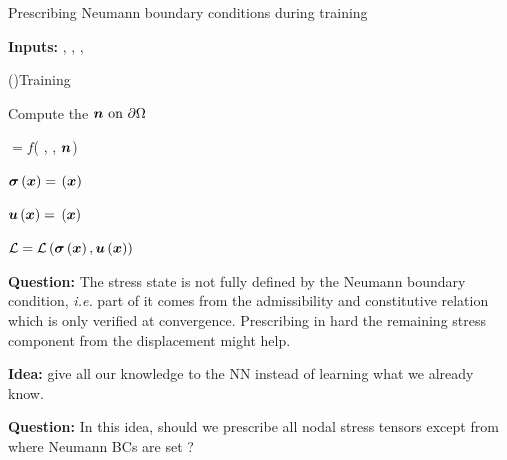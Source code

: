 
{}
\SetEndCharOfAlgoLine{}
\begin{algorithm}[hbtp!]
	\caption{Prescribing Neumann boundary conditions during training}\label{alg:NeumannBCs}
	\textbf{Inputs: } , , ,  \textcolor{GreenLMS}{}
	
	\While(\textcolor{GreenLMS}{}){Training}{
		Compute the $\boldsymbol{n}\text{ on }\partial \Omega$ \textcolor{GreenLMS}{}
		
		  $ = f$( , , $\boldsymbol{n}$)  \textcolor{GreenLMS}{}
		 
		 $\mathcal{\boldsymbol{\sigma}} \left(\boldsymbol{x} \right) = $  $\left(\boldsymbol{x} \right)$ \textcolor{GreenLMS}{}
		 
		 $\boldsymbol{u} \left(\boldsymbol{x} \right) = $  $\left(\boldsymbol{x} \right)$    \textcolor{GreenLMS}{}
		 
		 $\mathcal{L} = \mathcal{L}\left(\mathcal{\boldsymbol{\sigma}} \left(\boldsymbol{x} \right) , \boldsymbol{u} \left(\boldsymbol{x} \right)  \right)$  \textcolor{GreenLMS}{}

		  \textcolor{GreenLMS}{}

	}
\end{algorithm}
\newpage
{}

\textbf{\textcolor{accentcolor}{Question:}} The stress state is not fully defined by the Neumann boundary condition, \emph{i.e.} part of it comes from the admissibility and constitutive relation which is only verified at convergence. Prescribing in hard the remaining stress component from the displacement might help. 

\textbf{\textcolor{accentcolor}{Idea:}} give all our knowledge to the NN instead of learning what we already know. 

\textbf{\textcolor{accentcolor}{Question:}} In this idea, should we prescribe all nodal stress tensors except from where Neumann BCs are set ?
